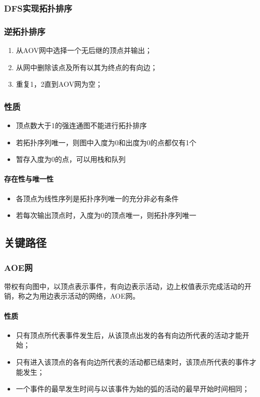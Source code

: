 \subsubsection{DFS实现拓扑排序}

\subsubsection{逆拓扑排序}
\begin{enumerate}
    \item 从AOV网中选择一个无后继的顶点并输出；
    \item 从网中删除该点及所有以其为终点的有向边；
    \item 重复1，2直到AOV网为空；
\end{enumerate}


\subsubsection{性质}

\begin{itemize}
    \item 顶点数大于1的强连通图不能进行拓扑排序
    \item 若拓扑序列唯一，则图中入度为0和出度为0的点都仅有1个
    \item 暂存入度为0的点，可以用栈和队列
\end{itemize}

\paragraph{存在性与唯一性}
\begin{itemize}
    \item 各顶点为线性序列是拓扑序列唯一的充分非必有条件
    \item 若每次输出顶点时，入度为0的顶点唯一，则拓扑序列唯一
\end{itemize}


\subsection{关键路径}

\subsubsection{AOE网}
带权有向图中，以顶点表示事件，有向边表示活动，边上权值表示完成活动的开销，称之为用边表示活动的网络，AOE网。

\paragraph{性质}
\begin{itemize}
    \item 只有顶点所代表事件发生后，从该顶点出发的各有向边所代表的活动才能开始；
    \item 只有进入该顶点的各有向边所代表的活动都已结束时，该顶点所代表的事件才能发生；
    \item 一个事件的最早发生时间与以该事件为始的弧的活动的最早开始时间相同；
\end{itemize}


